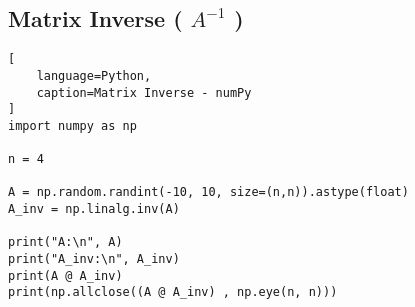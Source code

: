 \subsection{Matrix Inverse ( $A^{-1}$ ) \cite{mfml/book/mml/Deisenroth-Faisal-Ong}}

\begin{lstlisting}[
    language=Python,
    caption=Matrix Inverse - numPy
]
import numpy as np

n = 4

A = np.random.randint(-10, 10, size=(n,n)).astype(float)
A_inv = np.linalg.inv(A)

print("A:\n", A)
print("A_inv:\n", A_inv)
print(A @ A_inv)
print(np.allclose((A @ A_inv) , np.eye(n, n)))
\end{lstlisting}






